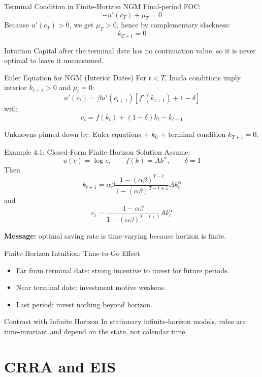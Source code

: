 \documentclass[aspectratio=169,10pt]{beamer}
\begin{document}
\begin{frame}{Terminal Condition in Finite-Horizon NGM}
Final-period FOC:
\[
-u'(c_T)+\mu_T=0
\]
Because $u'(c_T)>0$, we get $\mu_T>0$, hence by complementary slackness:
\[
k_{T+1}=0
\]

\begin{block}{Intuition}
Capital after the terminal date has no continuation value, so it is never optimal to leave it unconsumed.
\end{block}
\end{frame}

\begin{frame}{Euler Equation for NGM (Interior Dates)}
For $t<T$, Inada conditions imply interior $k_{t+1}>0$ and $\mu_t=0$:
\[
 u'(c_t)=\beta u'(c_{t+1})\left[f'(k_{t+1})+1-\delta\right]
\]
with
\[
c_t=f(k_t)+(1-\delta)k_t-k_{t+1}
\]

Unknowns pinned down by: Euler equations + $k_0$ + terminal condition $k_{T+1}=0$.
\end{frame}

\begin{frame}{Example 4.1: Closed-Form Finite-Horizon Solution}
Assume:
\[
u(c)=\log c,\qquad f(k)=Ak^{\alpha},\qquad \delta=1
\]
Then
\[
k_{t+1}=\alpha\beta\frac{1-(\alpha\beta)^{T-t}}{1-(\alpha\beta)^{T-t+1}}Ak_t^{\alpha}
\]
and
\[
c_t=\frac{1-\alpha\beta}{1-(\alpha\beta)^{T-t+1}}Ak_t^{\alpha}
\]

\textbf{Message:} optimal saving rate is time-varying because horizon is finite.
\end{frame}

\begin{frame}{Finite-Horizon Intuition: Time-to-Go Effect}
\begin{itemize}
  \item Far from terminal date: strong incentive to invest for future periods.
  \item Near terminal date: investment motive weakens.
  \item Last period: invest nothing beyond horizon.
\end{itemize}

\begin{block}{Contrast with Infinite Horizon}
In stationary infinite-horizon models, rules are time-invariant and depend on the state, not calendar time.
\end{block}
\end{frame}

\section{CRRA and EIS}
\end{document}
